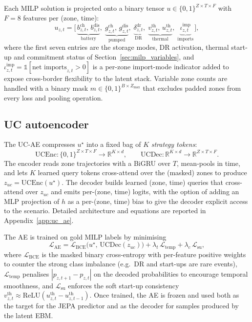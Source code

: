 \documentclass{article}
\begin{document}
Each MILP solution is projected onto a binary tensor $u \in \{0,1\}^{Z \times T \times F}$ with $F=8$ features per (zone, time):
\begin{equation}
u_{z,t} = \bigl[\,
  \underbrace{b^{\mathrm{ch}}_{z,t},\, b^{\mathrm{dis}}_{z,t}}_{\text{battery}},\;
  \underbrace{g^{\mathrm{ch}}_{z,t},\, g^{\mathrm{dis}}_{z,t}}_{\text{pumped}},\;
  \underbrace{\delta^{\mathrm{dr}}_{z,t}}_{\text{DR}},\;
  \underbrace{v^{\mathrm{th}}_{z,t},\, u^{\mathrm{th}}_{z,t}}_{\text{thermal}},\;
  \underbrace{\iota^{\mathrm{imp}}_{z,t}}_{\text{imports}}
\,\bigr],
\label{eq:ebm_features}
\end{equation}
where the first seven entries are the storage modes, DR activation, thermal start-up and commitment status of Section~\ref{sec:milp_variables}, and $\iota^{\mathrm{imp}}_{z,t} = \mathbb{1}[\text{net imports}_{z,t} > 0]$ is a per-zone import-mode indicator added to expose cross-border flexibility to the latent stack. Variable zone counts are handled with a binary mask $m \in \{0,1\}^{B \times Z_{\max}}$ that excludes padded zones from every loss and pooling operation.

\subsection{UC autoencoder}
\label{sec:uc_ae}

The UC-AE compresses $u^\star$ into a fixed bag of $K$ \emph{strategy tokens}:
\begin{equation}
\mathrm{UCEnc}: \{0,1\}^{Z\times T\times F} \longrightarrow \mathbb{R}^{K \times d}, \qquad
\mathrm{UCDec}: \mathbb{R}^{K\times d} \longrightarrow \mathbb{R}^{Z\times T\times F}.
\label{eq:ae_signature}
\end{equation}
The encoder reads zone trajectories with a BiGRU over $T$, mean-pools in time, and lets $K$ learned query tokens cross-attend over the (masked) zones to produce $z_{uc} = \mathrm{UCEnc}(u^\star)$. The decoder builds learned (zone, time) queries that cross-attend over $z_{uc}$ and emits per-(zone, time) logits, with the option of adding an MLP projection of $h$ as a per-(zone, time) bias to give the decoder explicit access to the scenario. Detailed architecture and equations are reported in Appendix~\ref{app:uc_ae}.

The AE is trained on gold MILP labels by minimising
\begin{equation}
\mathcal{L}_{\mathrm{AE}} = \mathcal{L}_{\mathrm{BCE}}\bigl(u^\star,\, \mathrm{UCDec}(z_{uc})\bigr) + \lambda_t\,\mathcal{L}_{\mathrm{temp}} + \lambda_c\,\mathcal{L}_{\mathrm{su}},
\label{eq:ae_loss}
\end{equation}
where $\mathcal{L}_{\mathrm{BCE}}$ is the masked binary cross-entropy with per-feature positive weights to counter the strong class imbalance (e.g.\ DR and start-ups are rare events), $\mathcal{L}_{\mathrm{temp}}$ penalises $|p_{z,t+1} - p_{z,t}|$ on the decoded probabilities to encourage temporal smoothness, and $\mathcal{L}_{\mathrm{su}}$ enforces the soft start-up consistency $v^{\mathrm{th}}_{z,t} \approx \mathrm{ReLU}(u^{\mathrm{th}}_{z,t} - u^{\mathrm{th}}_{z,t-1})$. Once trained, the AE is frozen and used both as the target for the JEPA predictor and as the decoder for samples produced by the latent EBM.
\end{document}
